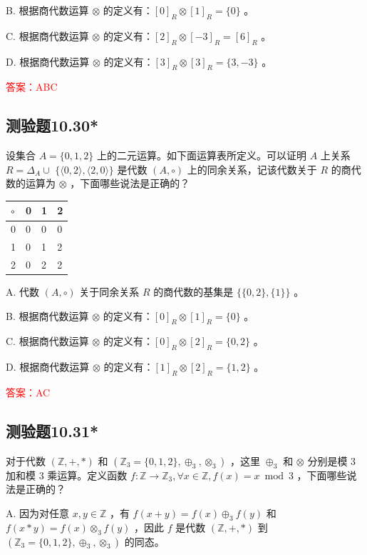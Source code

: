 \documentclass[UTF8, heading=true]{ctexart}
\begin{document}
B. 根据商代数运算 $\otimes$ 的定义有：$[0]_R \otimes[1]_R=\{0\}$ 。

C. 根据商代数运算 $\otimes$ 的定义有：$[2]_R \otimes[-3]_R=[6]_R$ 。

D. 根据商代数运算 $\otimes$ 的定义有：$[3]_R \otimes[3]_R=\{3,-3\}$ 。

\textcolor{red}{答案：ABC}

\subsection{测验题10.30*}

设集合 $A=\{0,1,2\}$ 上的二元运算。如下面运算表所定义。可以证明 $A$ 上关系 $R=\Delta_A \cup$ $\{\langle 0,2\rangle,\langle 2,0\rangle\}$ 是代数 $(A, \circ)$ 上的同余关系，记该代数关于 $R$ 的商代数的运算为 $\otimes$ ，下面哪些说法是正确的？
\begin{table}[H]
  \renewcommand{\arraystretch}{1.5}
  \centering
  \begin{tabular}{l|lll}
\hline$\circ$ & 0 & 1 & 2 \\
\hline 0 & 0 & 0 & 0 \\
1 & 0 & 1 & 2 \\
2 & 0 & 2 & 2 \\
\hline
\end{tabular}
\end{table}

A. 代数 $(A, \circ)$ 关于同余关系 $R$ 的商代数的基集是 $\{\{0,2\},\{1\}\}$ 。

B. 根据商代数运算 $\otimes$ 的定义有：$[0]_R \otimes[1]_R=\{0\}$ 。

C. 根据商代数运算 $\otimes$ 的定义有：$[0]_R \otimes[2]_R=\{0,2\}$ 。

D. 根据商代数运算 $\otimes$ 的定义有：$[1]_R \otimes[2]_R=\{1,2\}$ 。

\textcolor{red}{答案：AC}

\subsection{测验题10.31*}

对于代数 $(\mathbb{Z},+, *)$ 和 $\left(\mathbb{Z}_3=\{0,1,2\}, \oplus_3, \otimes_3\right)$ ，这里 $\oplus_3$ 和 $\otimes$ 分别是模 3 加和模 3 乘运算。定义函数 $f: \mathbb{Z} \rightarrow \mathbb{Z}_3, \forall x \in \mathbb{Z}, f(x)=x \bmod 3$ ，下面哪些说法是正确的？

A. 因为对任意 $x, y \in \mathbb{Z}$ ，有 $f(x+y)=f(x) \oplus_3 f(y)$ 和 $f(x * y)=f(x) \otimes_3 f(y)$ ，因此 $f$ 是代数 $(\mathbb{Z},+, *)$ 到 $\left(\mathbb{Z}_3=\{0,1,2\}, \oplus_3, \otimes_3\right)$ 的同态。
\end{document}
